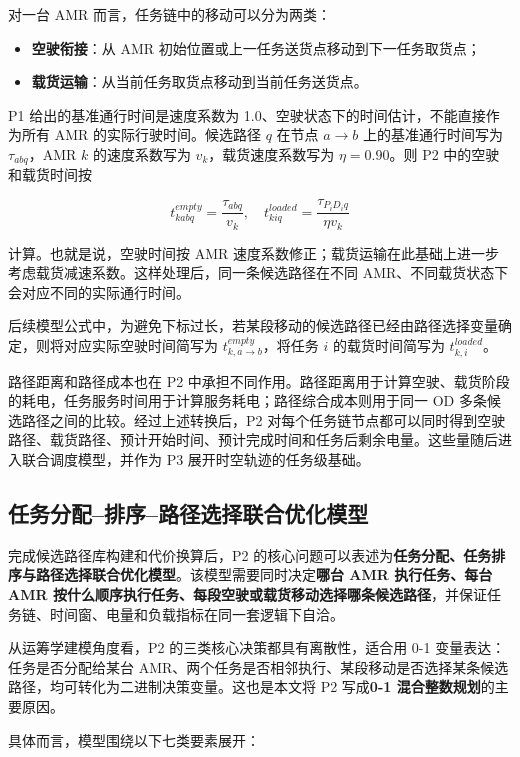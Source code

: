 对一台 AMR 而言，任务链中的移动可以分为两类：

\begin{itemize}
  \item \textbf{空驶衔接}：从 AMR 初始位置或上一任务送货点移动到下一任务取货点；
  \item \textbf{载货运输}：从当前任务取货点移动到当前任务送货点。
\end{itemize}

P1 给出的基准通行时间是速度系数为 1.0、空驶状态下的时间估计，不能直接作为所有 AMR 的实际行驶时间。候选路径 $q$ 在节点 $a\to b$ 上的基准通行时间写为 $\tau_{abq}$，AMR $k$ 的速度系数写为 $v_k$，载货速度系数写为 $\eta=0.90$。则 P2 中的空驶和载货时间按

\[
t^{empty}_{kabq}=\frac{\tau_{abq}}{v_k},\quad
t^{loaded}_{kiq}=\frac{\tau_{P_iD_iq}}{\eta v_k}
\]

计算。也就是说，空驶时间按 AMR 速度系数修正；载货运输在此基础上进一步考虑载货减速系数。这样处理后，同一条候选路径在不同 AMR、不同载货状态下会对应不同的实际通行时间。

后续模型公式中，为避免下标过长，若某段移动的候选路径已经由路径选择变量确定，则将对应实际空驶时间简写为 $t^{empty}_{k,a\to b}$，将任务 $i$ 的载货时间简写为 $t^{loaded}_{k,i}$。

路径距离和路径成本也在 P2 中承担不同作用。路径距离用于计算空驶、载货阶段的耗电，任务服务时间用于计算服务耗电；路径综合成本则用于同一 OD 多条候选路径之间的比较。经过上述转换后，P2 对每个任务链节点都可以同时得到空驶路径、载货路径、预计开始时间、预计完成时间和任务后剩余电量。这些量随后进入联合调度模型，并作为 P3 展开时空轨迹的任务级基础。

\subsection{任务分配--排序--路径选择联合优化模型}

完成候选路径库构建和代价换算后，P2 的核心问题可以表述为\textbf{任务分配、任务排序与路径选择联合优化模型}。该模型需要同时决定\textbf{哪台 AMR 执行任务、每台 AMR 按什么顺序执行任务、每段空驶或载货移动选择哪条候选路径}，并保证任务链、时间窗、电量和负载指标在同一套逻辑下自洽。

从运筹学建模角度看，P2 的三类核心决策都具有离散性，适合用 0-1 变量表达：任务是否分配给某台 AMR、两个任务是否相邻执行、某段移动是否选择某条候选路径，均可转化为二进制决策变量。这也是本文将 P2 写成\textbf{0-1 混合整数规划}的主要原因。

具体而言，模型围绕以下七类要素展开：

